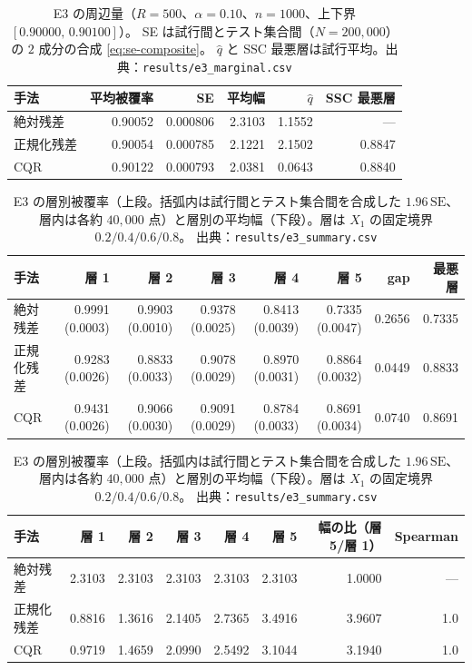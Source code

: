\documentclass[a4paper,11pt]{jsarticle}
\theoremstyle{definition}
\theoremstyle{plain}
\theoremstyle{remark}
\newcommand{\qhat}{\hat{q}}
\begin{document}
\begin{table}[htbp]
  \centering
  \caption{E3 の周辺量（$R=500$、$\alpha=0.10$、$n=1000$、上下界 $[0.90000,\,0.90100]$）。
    SE は試行間とテスト集合間（$N=200{,}000$）の $2$ 成分の合成 \eqref{eq:se-composite}。
    $\qhat$ と SSC 最悪層は試行平均。出典：\texttt{results/e3\_marginal.csv}}
  \label{tab:e3-marginal}
  \begin{tabular}{lrrrrr}
    \toprule
    手法 & 平均被覆率 & SE & 平均幅 & $\qhat$ & SSC 最悪層 \\
    \midrule
    絶対残差 & 0.90052 & 0.000806 & 2.3103 & 1.1552 & — \\
    正規化残差 & 0.90054 & 0.000785 & 2.1221 & 2.1502 & 0.8847 \\
    CQR & 0.90122 & 0.000793 & 2.0381 & 0.0643 & 0.8840 \\
    \bottomrule
  \end{tabular}
\end{table}

\begin{table}[htbp]
  \centering
  \caption{E3 の層別被覆率（上段。括弧内は試行間とテスト集合間を合成した $1.96\,\mathrm{SE}$、
    層内は各約 $40{,}000$ 点）と層別の平均幅（下段）。層は $X_1$ の固定境界 $0.2/0.4/0.6/0.8$。
    出典：\texttt{results/e3\_summary.csv}}
  \label{tab:e3-stratified}
  \footnotesize
  \setlength{\tabcolsep}{2.2pt}
  \begin{tabular}{lrrrrrrr}
    \toprule
    手法 & 層 1 & 層 2 & 層 3 & 層 4 & 層 5 & gap & 最悪層 \\
    \midrule
    絶対残差 & 0.9991 (0.0003) & 0.9903 (0.0010) & 0.9378 (0.0025) & 0.8413 (0.0039) & 0.7335 (0.0047) & 0.2656 & 0.7335 \\
    正規化残差 & 0.9283 (0.0026) & 0.8833 (0.0033) & 0.9078 (0.0029) & 0.8970 (0.0031) & 0.8864 (0.0032) & 0.0449 & 0.8833 \\
    CQR & 0.9431 (0.0026) & 0.9066 (0.0030) & 0.9091 (0.0029) & 0.8784 (0.0033) & 0.8691 (0.0034) & 0.0740 & 0.8691 \\
    \bottomrule
  \end{tabular}

  \medskip
  \begin{tabular}{lrrrrrrr}
    \toprule
    手法 & 層 1 & 層 2 & 層 3 & 層 4 & 層 5 & 幅の比（層 5/層 1） & Spearman \\
    \midrule
    絶対残差 & 2.3103 & 2.3103 & 2.3103 & 2.3103 & 2.3103 & 1.0000 & — \\
    正規化残差 & 0.8816 & 1.3616 & 2.1405 & 2.7365 & 3.4916 & 3.9607 & 1.0 \\
    CQR & 0.9719 & 1.4659 & 2.0990 & 2.5492 & 3.1044 & 3.1940 & 1.0 \\
    \bottomrule
  \end{tabular}
\end{table}
\end{document}
